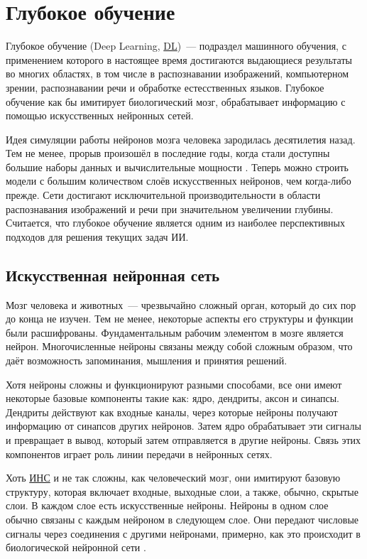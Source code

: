 \section{Глубокое обучение} \label{ch1:dl}

Глубокое обучение (Deep Learning, \hyperref[acr:dl]{DL})~--- подраздел машинного обучения, с применением которого в настоящее время достигаются выдающиеся результаты во многих областях, в том числе в распознавании изображений, компьютерном зрении, распознавании речи и обработке естесственных языков. Глубокое обучение как бы имитирует биологический мозг, обрабатывает информацию с помощью искусственных нейронных сетей.

Идея симуляции работы нейронов мозга человека зародилась десятилетия назад. Тем не менее, прорыв произошёл в последние годы, когда стали доступны большие наборы данных и вычислительные мощности \cite{10.1145/2771283}. Теперь можно строить модели с большим количеством слоёв искусственных нейронов, чем когда-либо прежде. Сети достигают исключительной производительности в области распознавания изображений и речи при значительном увеличении глубины. Считается, что глубокое обучение является одним из наиболее перспективных подходов для решения текущих задач ИИ.

\subsection{Искусственная нейронная сеть}

Мозг человека и животных~--- чрезвычайно сложный орган, который до сих пор до конца не изучен. Тем не менее, некоторые аспекты его структуры и функции были расшифрованы. Фундаментальным рабочим элементом в мозге является нейрон. Многочисленные нейроны связаны между собой сложным образом, что даёт возможность запоминания, мышления и принятия решений.

Хотя нейроны сложны и функционируют разными способами, все они имеют некоторые базовые компоненты такие как: ядро, дендриты, аксон и синапсы. Дендриты действуют как входные каналы, через которые нейроны получают информацию от синапсов других нейронов. Затем ядро обрабатывает эти сигналы и превращает в вывод, который затем отправляется в другие нейроны. Связь этих компонентов играет роль линии передачи в нейронных сетях.

Хоть \hyperref[acr:ann]{ИНС} и не так сложны, как человеческий мозг, они имитируют базовую структуру, которая включает входные, выходные слои, а также, обычно, скрытые слои. В каждом слое есть искусственные нейроны. Нейроны в одном слое обычно связаны с каждым нейроном в следующем слое. Они передают числовые сигналы через соединения с другими нейронами, примерно, как это происходит в биологической нейронной сети \cite{296402}.

